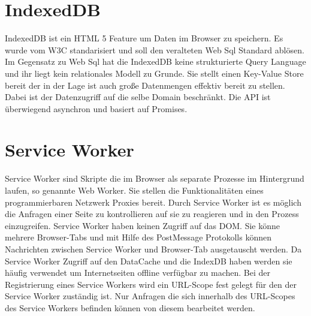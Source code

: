 
\section{IndexedDB}

IndexedDB ist ein HTML 5 Feature um Daten im Browser zu speichern. Es wurde vom W3C standarisiert\cite{w3IndexedDB} und soll den veralteten Web Sql Standard ablösen. Im Gegensatz zu Web Sql hat die IndexedDB keine strukturierte Query Language und ihr liegt kein relationales Modell zu Grunde. Sie stellt einen Key-Value Store bereit der in der Lage ist auch große Datenmengen effektiv bereit zu stellen. Dabei ist der Datenzugriff auf die selbe Domain beschränkt. Die API ist überwiegend asynchron und basiert auf Promises.

\section{Service Worker}
Service Worker sind Skripte die im Browser als separate Prozesse im Hintergrund laufen, so genannte Web Worker. Sie stellen die Funktionalitäten eines programmierbaren Netzwerk Proxies bereit. Durch Service Worker ist es möglich die Anfragen einer Seite zu kontrollieren auf sie zu reagieren und in den Prozess einzugreifen.\cite{w3ServiceWorker} Service Worker haben keinen Zugriff auf das DOM. Sie könne mehrere Browser-Tabs und mit Hilfe des PostMessage Protokolls können Nachrichten zwischen Service Worker und Browser-Tab ausgetauscht werden. Da Service Worker Zugriff auf den DataCache und die IndexDB haben werden sie häufig verwendet um Internetseiten offline verfügbar zu machen. Bei der Registrierung eines Service Workers wird ein URL-Scope fest gelegt für den der Service Worker zuständig ist. Nur Anfragen die sich innerhalb des URL-Scopes des Service Workers befinden können von diesem bearbeitet werden.

